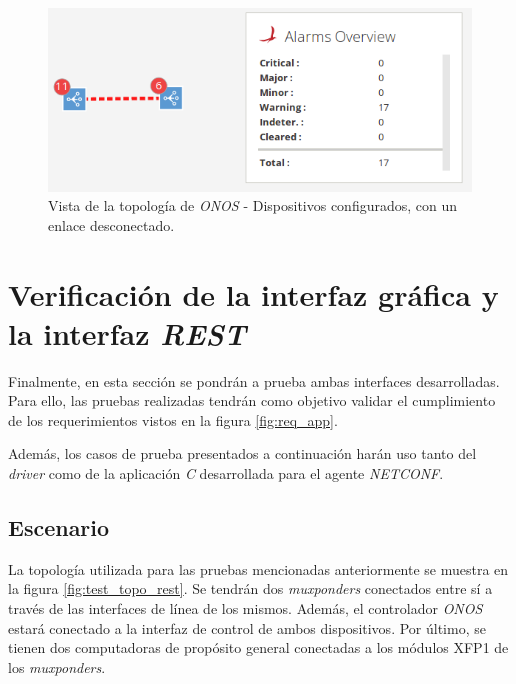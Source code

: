   \begin{figure}[H]
	\centering
	\includegraphics[scale=0.5]{Figures/test5_3.png}
	\caption{Vista de la topología de \textit{ONOS} - Dispositivos configurados, con un enlace desconectado.}
	\label{fig:test5_3}
  \end{figure}




\section{Verificación de la interfaz gráfica y la interfaz \textit{REST}}

Finalmente, en esta sección se pondrán a prueba ambas interfaces desarrolladas. Para ello, las pruebas realizadas tendrán como objetivo validar el cumplimiento de los requerimientos vistos en la figura \ref{fig:req_app}. 

Además, los casos de prueba presentados a continuación harán uso tanto del \textit{driver} como de la aplicación \textit{C} desarrollada para el agente \textit{NETCONF}.


\subsection{Escenario}

La topología utilizada para las pruebas mencionadas anteriormente se muestra en la figura \ref{fig:test_topo_rest}. 
Se tendrán dos \textit{muxponders} conectados entre sí a través de las interfaces de línea de los mismos. Además, el controlador \textit{ONOS} estará conectado a la interfaz de control de ambos dispositivos. Por último, se tienen dos computadoras de propósito general conectadas a los módulos XFP1 de los \textit{muxponders}.



